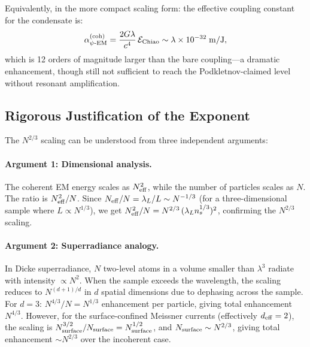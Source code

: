 \documentclass[aps,prd,twocolumn,superscriptaddress,floatfix,nofootinbib]{revtex4-2}
\newcommand{\lam}{\lambda}
\begin{document}
Equivalently, in the more compact scaling form: the effective coupling
constant for the condensate is:
\begin{equation}
\alpha_{\psi\text{-EM}}^{(\rm coh)}
= \frac{2G\lam}{c^4}\,\mathcal{E}_{\rm Chiao}
\sim \lam \times 10^{-32}\;\si{m/J},
\end{equation}
which is 12 orders of magnitude larger than the bare coupling---a
dramatic enhancement, though still not sufficient to reach the
Podkletnov-claimed level without resonant amplification.

\subsection{Rigorous Justification of the Exponent}
\label{sec:exponent}

The $N^{2/3}$ scaling can be understood from three independent
arguments:

\paragraph{Argument 1: Dimensional analysis.}
The coherent EM energy scales as $N_{\rm eff}^2$, while the number
of particles scales as $N$. The ratio is $N_{\rm eff}^2/N$.
Since $N_{\rm eff}/N = \lambda_L/L \sim N^{-1/3}$ (for a
three-dimensional sample where $L \propto N^{1/3}$), we get
$N_{\rm eff}^2/N = N^{2/3}\,(\lambda_L n_s^{1/3})^2$,
confirming the $N^{2/3}$ scaling.

\paragraph{Argument 2: Superradiance analogy.}
In Dicke superradiance, $N$ two-level atoms in a volume smaller than
$\lambda^3$ radiate with intensity $\propto N^2$. When the sample
exceeds the wavelength, the scaling reduces to $N^{(d+1)/d}$ in
$d$ spatial dimensions due to dephasing across the sample. For
$d = 3$: $N^{4/3}/N = N^{1/3}$ enhancement per particle, giving
total enhancement $N^{4/3}$. However, for the surface-confined
Meissner currents (effectively $d_{\rm eff} = 2$), the scaling is
$N_{\rm surface}^{3/2}/N_{\rm surface} = N_{\rm surface}^{1/2}$,
and $N_{\rm surface} \sim N^{2/3}$, giving total enhancement
$\sim N^{2/3}$ over the incoherent case.
\end{document}
